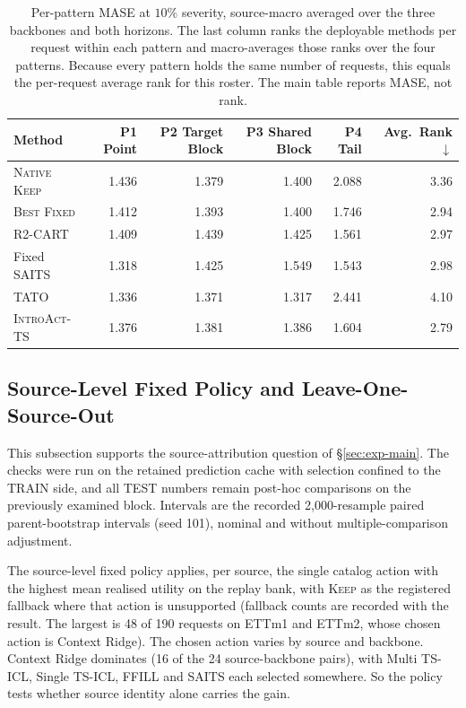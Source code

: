 \documentclass{article}
\newcommand{\introact}{\textsc{IntroAct-TS}}
\begin{document}
\begin{table}[htbp]
  \caption{Per-pattern MASE at $10\%$ severity, source-macro averaged over the three
  backbones and both horizons. The last column ranks the deployable methods per request
  within each pattern and macro-averages those ranks over the four patterns. Because every
  pattern holds the same number of requests, this equals the per-request average rank for this roster. The main table reports MASE, not rank.}
  \label{tab:app-pattern-res}
  \centering
  \small
  \setlength{\tabcolsep}{4pt}
\begin{tabular*}{\textwidth}{@{\extracolsep{\fill}}lrrrrr@{}}
    \toprule
    Method & P1 Point & P2 Target Block & P3 Shared Block & P4 Tail & Avg.\ Rank $\downarrow$ \\
    \midrule
    \textsc{Native Keep} & 1.436 & 1.379 & 1.400 & 2.088 & 3.36 \\
    \textsc{Best Fixed}  & 1.412   & 1.393   & 1.400   & 1.746   & 2.94 \\
    R2-CART              & 1.409   & 1.439   & 1.425   & 1.561   & 2.97 \\
    Fixed SAITS & 1.318 & 1.425 & 1.549 & 1.543 & 2.98 \\
    TATO & 1.336 & 1.371 & 1.317 & 2.441 & 4.10 \\
    \midrule
    \rowcolor{bestgray}\introact{} & 1.376 & 1.381 & 1.386 & 1.604 & 2.79 \\
    \bottomrule
  \end{tabular*}
\end{table}

\subsection{Source-Level Fixed Policy and Leave-One-Source-Out}
\label{app:source-diagnostics}
This subsection supports the source-attribution question of \S\ref{sec:exp-main}. The
checks were run on the retained prediction cache with selection confined to the TRAIN
side, and all TEST numbers remain post-hoc comparisons on the previously examined block.
Intervals are the recorded 2,000-resample paired parent-bootstrap intervals (seed 101),
nominal and without multiple-comparison adjustment.

The source-level fixed policy applies, per source, the single catalog action with the
highest mean realised utility on the replay bank, with \textsc{Keep} as the registered
fallback where that action is unsupported (fallback counts are recorded with the result. The largest is 48 of 190 requests on ETTm1 and ETTm2, whose chosen action is Context
Ridge). The chosen action varies by source and backbone. Context Ridge dominates (16 of
the 24 source-backbone pairs), with Multi TS-ICL, Single TS-ICL, FFILL and SAITS each
selected somewhere. So the policy tests whether
source identity alone carries the gain.
\end{document}

